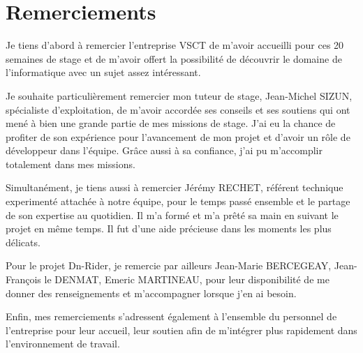 \chapter*{Remerciements}

Je tiens d’abord à remercier l’entreprise VSCT de m’avoir accueilli pour ces 20 semaines de stage
et de m’avoir offert la possibilité de découvrir le domaine de l'informatique avec un sujet assez intéressant.

Je souhaite particulièrement remercier mon tuteur de stage, Jean-Michel SIZUN, spécialiste d'exploitation,
de m’avoir accordée ses conseils et ses soutiens qui ont mené à bien une grande partie de mes missions de stage.
J’ai eu la chance de profiter de son expérience pour l’avancement de mon projet et d'avoir un rôle de développeur dans l'équipe.
Grâce aussi à sa confiance, j'ai pu m'accomplir totalement dans mes missions.

Simultanément, je tiens aussi à remercier Jérémy RECHET, référent technique experimenté attachée à notre équipe,
pour le temps passé ensemble et le partage de son expertise au quotidien.
Il m’a formé et m’a prêté sa main en suivant le projet en même temps.
Il fut d'une aide précieuse dans les moments les plus délicats.

Pour le projet Dn-Rider, je remercie par ailleurs Jean-Marie BERCEGEAY, Jean-François le DENMAT, Emeric MARTINEAU, pour leur disponibilité de me donner des
renseignements et m’accompagner lorsque j'en ai besoin.

Enfin, mes remerciements s’adressent également à l’ensemble du personnel de l’entreprise
pour leur accueil, leur soutien afin de m’intégrer plus rapidement dans l’environnement de travail.
